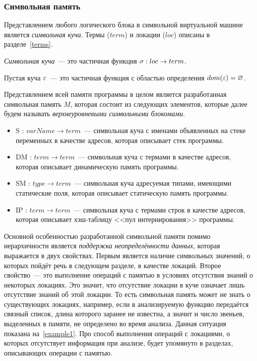 \subsubsection{Символьная память}

Представлением любого логического блока в символьной виртуальной машине является \emph{символьная куча}. Термы ($term$) и локации ($loc$) описаны в разделе~\ref{terms}.
\begin{defn}
\emph{Символьная куча}~--- это частичная функция ${\sigma : loc \rightarrow term}$.
\end{defn}

\begin{defn}\label{def:empty-heap}
Пустая куча $\varepsilon$~--- это частичная функция с областью определения $dom(\varepsilon)=\varnothing$.
\end{defn}

Представлением всей памяти программы в целом является разработанная символьная память $M$, которая состоит из следующих элементов, которые далее будем называть \emph{верхнеуровневыми символьными блокомами}.
\begin{itemize}
    \item S : $\mathit{varName} \rightarrow \mathit{term}$~--- символьная куча с именами объявленных на стеке переменных в качестве адресов, которая описывает стек программы.
    \item DM : $\mathit{term} \rightarrow \mathit{term}$~--- символьная куча с термами в качестве адресов, которая описывает динамическую память программы.
    \item SM : $\mathit{type} \rightarrow \mathit{term}$~--- символьная куча адресуемая типами, имеющими статические поля, которая описывает статическую память программы.
    \item IP : $\mathit{term} \rightarrow \mathit{term}$~--- символьная куча с термами строк в качестве адресов, которая описывает хэш-таблицу <<пул интернирования>> программы.
\end{itemize}

Основной особенностью разработанной символьной памяти помимо иерархичности является \emph{поддержка неопределённости данных}, которая выражается в двух свойствах. Первым является наличие символьных значений, о которых пойдёт речь в следующем разделе, в качестве локаций. Второе свойство~--- это выполнение операций с памятью в условиях отсутствия знаний о некоторых локациях. 
Это значит, что отсутствие локации в куче означает лишь отсутствие знаний об этой локации. 
То есть символьная память может не знать о существующих локациях, например, если в анализируемую функцию передаётся связный список, длина которого заранее не известна, а значит и число звеньев, выделенных в памяти, не определено во время анализа. Данная ситуация показана на~\autoref{example1}. Про способ выполнения операций с локациями, о которых отсутствует информация при анализе, будет упомянуто в разделах, описывающих операции с памятью.

